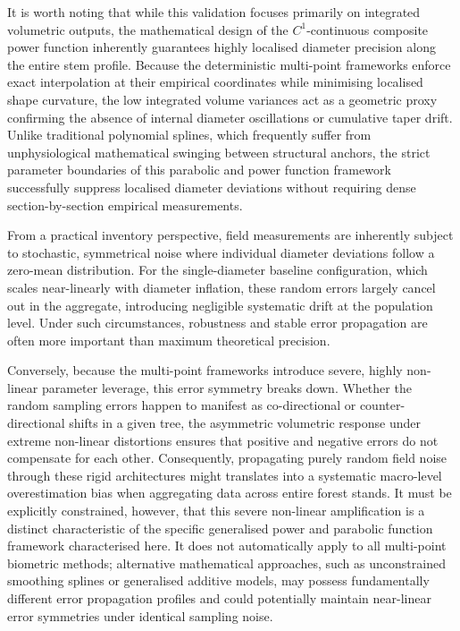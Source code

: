 \documentclass[twocolumn, bibliography=totoc]{scrartcl}
\begin{document}
It is worth noting that while this validation focuses primarily on integrated volumetric outputs, the mathematical design of the $C^1$-continuous composite power function inherently guarantees highly localised diameter precision along the entire stem profile. Because the deterministic multi-point frameworks enforce exact interpolation at their empirical coordinates while minimising localised shape curvature, the low integrated volume variances act as a geometric proxy confirming the absence of internal diameter oscillations or cumulative taper drift. Unlike traditional polynomial splines, which frequently suffer from unphysiological mathematical swinging between structural anchors, the strict parameter boundaries of this parabolic and power function framework successfully suppress localised diameter deviations without requiring dense section-by-section empirical measurements. 

From a practical inventory perspective, field measurements are inherently subject to stochastic, symmetrical noise where individual diameter deviations follow a zero-mean distribution. For the single-diameter baseline configuration, which scales near-linearly with diameter inflation, these random errors largely cancel out in the aggregate, introducing negligible systematic drift at the population level. Under such circumstances, robustness and stable error propagation are often more important than maximum theoretical precision. 

Conversely, because the multi-point frameworks introduce severe, highly non-linear parameter leverage, this error symmetry breaks down. Whether the random sampling errors happen to manifest as co-directional or counter-directional shifts in a given tree, the asymmetric volumetric response under extreme non-linear distortions ensures that positive and negative errors do not compensate for each other. Consequently, propagating purely random field noise through these rigid architectures might translates into a systematic macro-level overestimation bias when aggregating data across entire forest stands. It must be explicitly constrained, however, that this severe non-linear amplification is a distinct characteristic of the specific generalised power and parabolic function framework characterised here. It does not automatically apply to all multi-point biometric methods; alternative mathematical approaches, such as unconstrained smoothing splines or generalised additive models, may possess fundamentally different error propagation profiles and could potentially maintain near-linear error symmetries under identical sampling noise.
\end{document}

